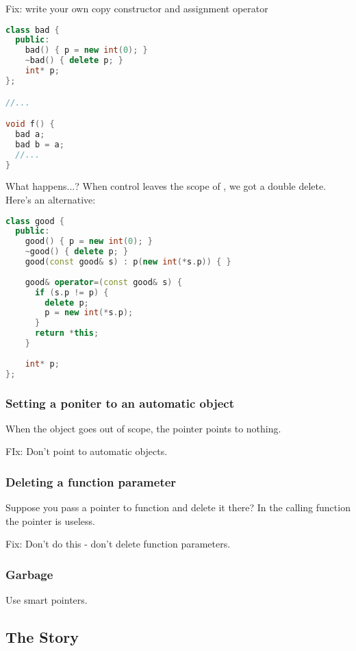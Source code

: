 Fix: write your own copy constructor and assignment operator

\begin{lstlisting}[language=C++]
class bad {
  public:
    bad() { p = new int(0); }
    ~bad() { delete p; }
    int* p;
};

//...

void f() {
  bad a;
  bad b = a;
  //...
}
\end{lstlisting}

What happens...? When control leaves the scope of , we got a double delete. Here's an alternative:

\begin{lstlisting}[language=C++]
class good {
  public:
    good() { p = new int(0); }
    ~good() { delete p; }
    good(const good& s) : p(new int(*s.p)) { }
    
    good& operator=(const good& s) {
      if (s.p != p) {
        delete p;
        p = new int(*s.p);
      }
      return *this;
    }
    
    int* p;
};
\end{lstlisting}

\subsubsection{Setting a poniter to an automatic object}

When the object goes out of scope, the pointer points to nothing.

FIx: Don't point to automatic objects.

\subsubsection{Deleting a function parameter}

Suppose you pass a pointer to function and delete it there? In the calling function the pointer is useless.

Fix: Don't do this - don't delete function parameters.

\subsubsection{Garbage}

Use smart pointers.

\subsection{The Story}


